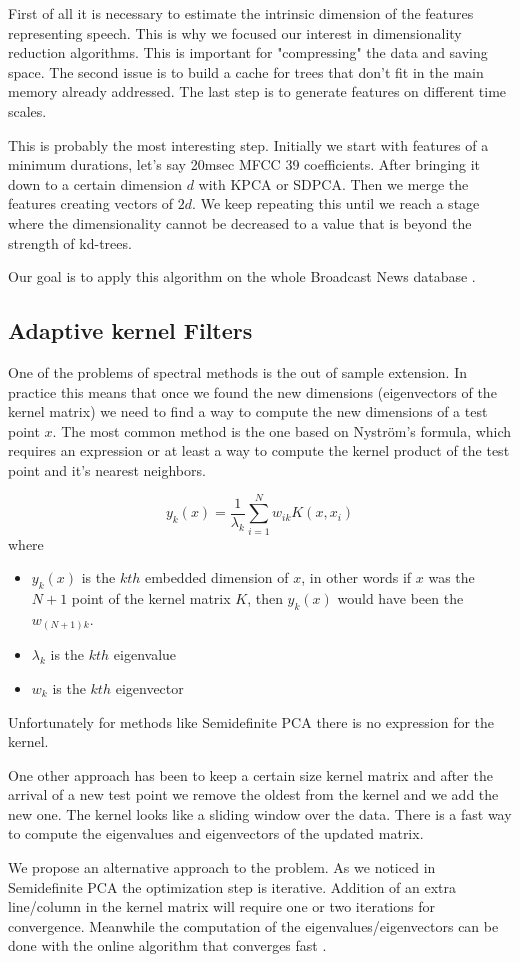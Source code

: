 \documentclass[12pt,letterpaper,doublespaced,ETD,dvips,proposal]{gtthesis}
\begin{document}
\begin{Body}
First of all it is necessary to estimate the intrinsic dimension of the features representing speech. This is why we focused our interest in dimensionality reduction algorithms. This is important for "compressing" the data and saving space. The second issue is to build a cache for trees that don't fit in the main memory already addressed. The last step is to generate features on different time scales. 

This is probably the most interesting step. Initially we start with features of a minimum durations, let's say 20msec MFCC 39 coefficients. After bringing it down to a certain dimension $d$ with KPCA or SDPCA. Then we merge the features creating vectors of $2d$. We keep repeating this until we reach a stage where the dimensionality cannot be decreased to a value that is beyond the strength of kd-trees.

Our goal is to apply this algorithm on the whole Broadcast News database \cite{graff1997bns}.

\subsection{Adaptive kernel Filters}
One of the problems of spectral methods is the out of sample
extension. In practice this means that once we found the new
dimensions (eigenvectors of the kernel matrix) we need to find a way
to compute the new dimensions of a test point $x$. The most common
method is the one based on Nystr\"{o}m's formula, which requires an
expression or at least a way to compute the kernel product of the
test point and it's nearest neighbors. 

\begin{equation}
y_k(x) = \frac{1}{\lambda_k}\sum_{i=1}^{N} w_{ik}K(x, x_i)
\end{equation}
where
\begin{itemize}
  \item $y_k(x)$ is the $kth$ embedded dimension of $x$, in other
  words if $x$ was the $N+1$ point of the kernel matrix $K$, then
  $y_k(x)$ would have been the $w_{(N+1)k}$.
  \item $\lambda_k$ is the $kth$ eigenvalue
  \item $w_k$ is the $kth$ eigenvector
\end{itemize}
Unfortunately for methods like Semidefinite PCA there is no
expression for the kernel.

One other approach \cite{vanvaerenbergh2006swk} has been to keep a certain size kernel matrix and
after the arrival of a new test point we remove the oldest from the
kernel and we add the new one. The kernel looks like a sliding
window over the data. There is a fast way to compute the eigenvalues
and eigenvectors of the updated matrix.

We propose an alternative approach to the problem. As we noticed in
Semidefinite PCA the optimization step is iterative. Addition of an
extra line/column in the kernel matrix will require one or two
iterations for convergence. Meanwhile the computation of the
eigenvalues/eigenvectors can be done with the  online algorithm that
converges fast \cite{gorrell2006gha}.

\end{Body}
\end{document}
